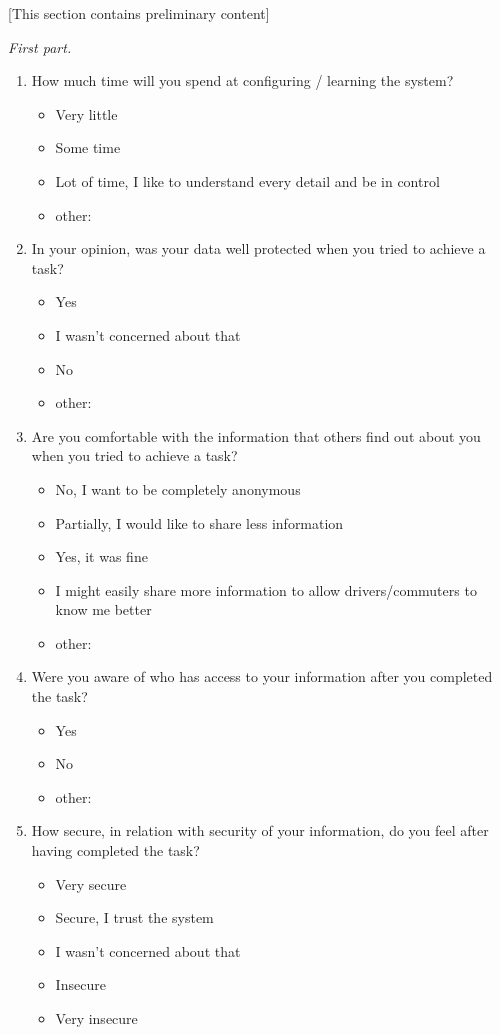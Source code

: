 [This section contains preliminary content]

\emph{First part.}

\begin{enumerate}
\item How much time will you spend at configuring / learning the system? 
	\begin{itemize}
	\item Very little
	\item Some time
	\item Lot of time, I like to understand every detail and be in control
	\item other: 
	\end{itemize}
\item In your opinion, was your data well protected when you tried to achieve a task? 
	\begin{itemize}
	\item Yes
	\item I wasn't concerned about that
	\item No
	\item other:
	\end{itemize}
\item Are you comfortable with the information that others find out about you when you tried to achieve a task? 
	\begin{itemize}
	\item No, I want to be completely anonymous
	\item Partially, I would like to share less information
	\item Yes, it was fine
	\item I might easily share more information to allow drivers/commuters to know me better
	\item other:
	\end{itemize}
\item Were you aware of who has access to your information after you completed the task?
	\begin{itemize}
	\item Yes
	\item No
	\item other:
	\end{itemize}
\item How secure, in relation with security of your information, do you feel after having completed the task? 
	\begin{itemize}
	\item Very secure
	\item Secure, I trust the system
	\item I wasn't concerned about that
	\item Insecure
	\item Very insecure 
	\end{itemize}
\end{enumerate}
	

